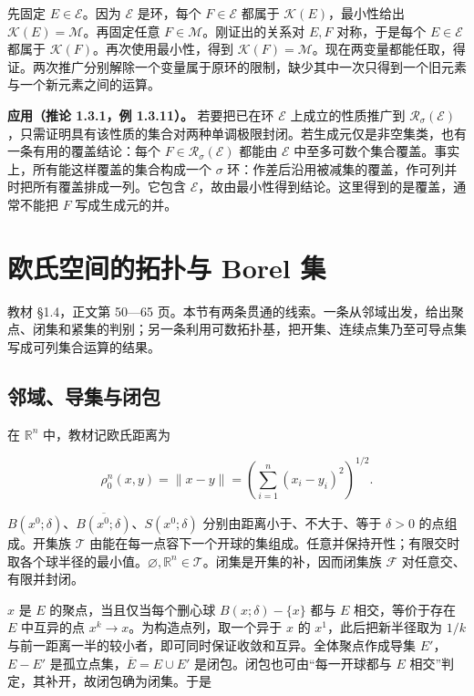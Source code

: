 \documentclass[11pt,a4paper]{article}
\begin{document}
先固定 \(E\in\mathcal E\)。因为 \(\mathcal E\) 是环，每个 \(F\in\mathcal E\) 都属于 \(\mathcal K(E)\)，最小性给出 \(\mathcal K(E)=\mathcal M\)。再固定任意 \(F\in\mathcal M\)。刚证出的关系对 \(E,F\) 对称，于是每个 \(E\in\mathcal E\) 都属于 \(\mathcal K(F)\)。再次使用最小性，得到 \(\mathcal K(F)=\mathcal M\)。现在两变量都能任取，得证。两次推广分别解除一个变量属于原环的限制，缺少其中一次只得到一个旧元素与一个新元素之间的运算。

\textbf{应用（推论 1.3.1，例 1.3.11）。} 若要把已在环 \(\mathcal E\) 上成立的性质推广到 \(\mathcal R_\sigma(\mathcal E)\)，只需证明具有该性质的集合对两种单调极限封闭。若生成元仅是非空集类，也有一条有用的覆盖结论：每个 \(F\in\mathcal R_\sigma(\mathcal E)\) 都能由 \(\mathcal E\) 中至多可数个集合覆盖。事实上，所有能这样覆盖的集合构成一个 \(\sigma\) 环：作差后沿用被减集的覆盖，作可列并时把所有覆盖排成一列。它包含 \(\mathcal E\)，故由最小性得到结论。这里得到的是覆盖，通常不能把 \(F\) 写成生成元的并。
\section{欧氏空间的拓扑与 Borel 集}

教材 §1.4，正文第 50---65 页。本节有两条贯通的线索。一条从邻域出发，给出聚点、闭集和紧集的判别；另一条利用可数拓扑基，把开集、连续点集乃至可导点集写成可列集合运算的结果。

\subsection{邻域、导集与闭包}

在 \(\mathbb R^n\) 中，教材记欧氏距离为

\[
\rho_0^n(x,y)=\|x-y\|=\left(\sum_{i=1}^n(x_i-y_i)^2\right)^{1/2}.
\]

\(B(x^0;\delta)\)、\(\overline{B(x^0;\delta)}\)、\(S(x^0;\delta)\) 分别由距离小于、不大于、等于 \(\delta>0\) 的点组成。开集族 \(\mathcal T\) 由能在每一点容下一个开球的集组成。任意并保持开性；有限交时取各个球半径的最小值。\(\varnothing,\mathbb R^n\in\mathcal T\)。闭集是开集的补，因而闭集族 \(\mathcal F\) 对任意交、有限并封闭。

\(x\) 是 \(E\) 的聚点，当且仅当每个删心球 \(B(x;\delta)-\{x\}\) 都与 \(E\) 相交，等价于存在 \(E\) 中互异的点 \(x^k\to x\)。为构造点列，取一个异于 \(x\) 的 \(x^1\)，此后把新半径取为 \(1/k\) 与前一距离一半的较小者，即可同时保证收敛和互异。全体聚点作成导集 \(E'\)，\(E-E'\) 是孤立点集，\(\overline E=E\cup E'\) 是闭包。闭包也可由``每一开球都与 \(E\) 相交''判定，其补开，故闭包确为闭集。于是
\end{document}
